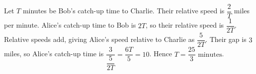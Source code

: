 Let $T$ minutes be Bob's catch-up time to Charlie. Their relative speed is $\dfrac{2}{T}$ miles per minute. Alice's catch-up time to Bob is $2T$, so their relative speed is $\dfrac{1}{2T}$. Relative speeds add, giving Alice's speed relative to Charlie as $\dfrac{5}{2T}$. Their gap is $3$ miles, so Alice's catch-up time is $\dfrac{3}{\dfrac{5}{2T}}=\dfrac{6T}{5}=10$. Hence $\boxed{T=\dfrac{25}{3}\text{ minutes}}$.
